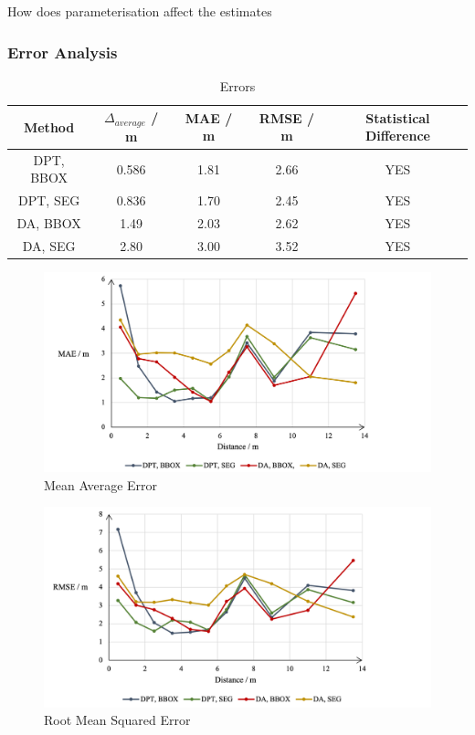 How does parameterisation affect the estimates

\clearpage

\subsubsection{Error Analysis}

\begin{table}[htbp]
    \centering
    \caption{Errors}
    \label{tab:distances}
    \begin{tabular}{ccccc}
        \textbf{Method} & \textbf{$\Delta_{average}$ / m} & \textbf{MAE / m} & \textbf{RMSE / m}
        & \textbf{Statistical Difference} \\
        \midrule
        DPT, BBOX & 0.586 & 1.81 & 2.66 & YES \\
        DPT, SEG  & 0.836 & 1.70 & 2.45 & YES \\
        DA, BBOX  & 1.49  & 2.03 & 2.62 & YES \\
        DA, SEG   & 2.80  & 3.00 & 3.52 & YES \\
    \end{tabular}
\end{table}

\clearpage

\begin{figure}[H]
    \centering
    \includegraphics[width=1.01\textwidth]{body/analysis/assets/errors/MAE}
    \caption{Mean Average Error}
    \label{fig:mae}
\end{figure}

\begin{figure}[H]
    \centering
    \includegraphics[width=1.01\textwidth]{body/analysis/assets/errors/RMSE}
    \caption{Root Mean Squared Error}
    \label{fig:rmse}
\end{figure}

